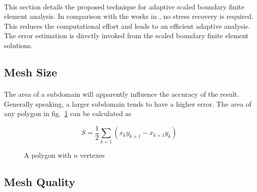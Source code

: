 \paragraph{}
This section details the proposed technique for adaptive scaled boundary finite element analysis. In comparison with the works in \cite{NME:NME439}, no stress recovery is required. This reduces the computational effort and leads to an efficient adaptive analysis. The error estimation is directly invoked from the scaled boundary finite element solutions.

\subsection{Mesh Size}
\paragraph{}
The area of a subdomain will apparently influence the accuracy of the result.
Generally speaking, a larger subdomain tends to have a higher error.
The area of any polygon in fig.~\ref{adap_fig:ei_polygon} can be calculated as 

\begin{equation}
    S = \frac{1}{2}
        \sum_{k=1}
        \left(
            x_k y_{k+1} - x_{k+1} y_k
        \right)
\end{equation}

\begin{figure}[!h]
    \centering
    \caption{A polygon with $n$ vertexes}
    \label{adap_fig:ei_polygon}
\end{figure}

\subsection{Mesh Quality}
